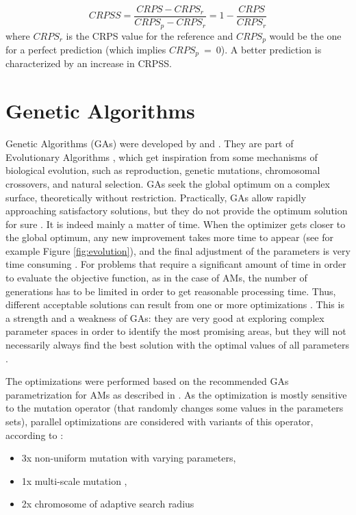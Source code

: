 \documentclass[review]{elsarticle}
\begin{document}
\begin{equation}
\label{eq:CRPSS}
CRPSS = \frac{CRPS-CRPS_{r}}{CRPS_{p}-CRPS_{r}} = 1-\frac{CRPS}{CRPS_{r}}
\end{equation}
where $CRPS_{r}$ is the CRPS value for the reference and $CRPS_{p}$ would be the one for a perfect prediction (which implies $CRPS_{p}~=~0$). A better prediction is characterized by an increase in CRPSS.


\section{Genetic Algorithms}
\label{sec:gas}

Genetic Algorithms (GAs) were developed by \citet{Holland1992b} and \citet{Goldberg1989}. They are part of Evolutionary Algorithms \citep{Back1993b, Schwefel1993}, which get inspiration from some mechanisms of biological evolution, such as reproduction, genetic mutations, chromosomal crossovers, and natural selection. GAs seek the global optimum on a complex surface, theoretically without restriction. Practically, GAs allow rapidly approaching satisfactory solutions, but they do not provide the optimum solution for sure \citep{Zitzler2004a}. It is indeed mainly a matter of time. When the optimizer gets closer to the global optimum, any new improvement takes more time to appear (see for example Figure \ref{fig:evolution}), and the final adjustment of the parameters is very time consuming \citep{Back1993a}. For problems that require a significant amount of time in order to evaluate the objective function, as in the case of AMs, the number of generations has to be limited in order to get reasonable processing time. Thus, different acceptable solutions can result from one or more optimizations \citep{Holland1992b}. This is a strength and a weakness of GAs: they are very good at exploring complex parameter spaces in order to identify the most promising areas, but they will not necessarily always find the best solution with the optimal values of all parameters \citep{Holland1992b}.

The optimizations were performed based on the recommended GAs parametrization for AMs as described in \citet{Horton2016a}. As the optimization is mostly sensitive to the mutation operator (that randomly changes some values in the parameters sets), parallel optimizations are considered with variants of this operator, according to \citet{Horton2016a}:

\begin{itemize}
	\item 3x non-uniform mutation \citep{Michalewicz1996} with varying parameters,
	\item 1x multi-scale mutation \citep{Horton2016a},
	\item 2x chromosome of adaptive search radius \citep{Horton2016a}
\end{itemize}
\end{document}
